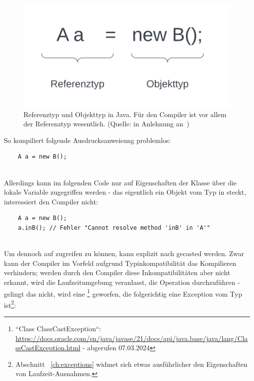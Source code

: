 \begin{figure}
    \begin{center}
        \includegraphics[scale=0.5]{chapters/OOP/img/types}
        \caption{Referenztyp und Objekttyp in Java. Für den Compiler ist vor allem der Referenztyp wesentlich. (Quelle: in Anlehnung an~\cite[467 f., ``Begrifflichkeit``]{Ull23})}
        \label{fig:types}
    \end{center}
\end{figure}

\noindent
So kompiliert folgende Ausdrucksanweisung problemlos:

\begin{verbatim}
    A a = new B();
\end{verbatim}\\

\noindent
Allerdings kann im folgenden Code nur auf Eigenschaften der Klasse  über die lokale Variable  zugegriffen werden - das eigentlich ein Objekt vom Typ  in  steckt, interessiert den Compiler nicht:\\

\begin{verbatim}
    A a = new B();
    a.inB(); // Fehler "Cannot resolve method 'inB' in 'A'"
\end{verbatim}\\


\noindent
Um dennoch auf  zugreifen zu können, kann  explizit nach  gecasted werden.
Zwar kann der Compiler im Vorfeld aufgrund Typinkompatibilität das Kompilieren verhindern; werden durch den Compiler diese Inkompatibilitäten aber nicht erkannt, wird die Laufzeitumgebung veranlasst, die Operation durchzuführen - gelingt das nicht, wird eine \footnote{
``Class ClassCastException``: \url{https://docs.oracle.com/en/java/javase/21/docs/api/java.base/java/lang/ClassCastException.html} - abgerufen 07.03.2024
} geworfen, die folgerichtig eine Exception vom Typ  ist\footnote{
Abschnitt ~\ref{ch:exceptions} widmet sich etwas ausführlicher den Eigenschaften von Laufzeit-Ausnahmen.
}:

